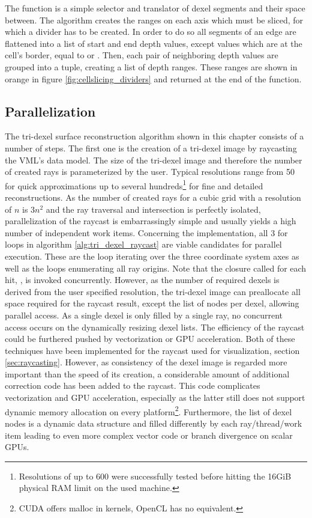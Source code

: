 The  function is a simple selector and translator of dexel segments and their space between.
The algorithm creates the ranges on each axis which must be sliced, \ie for which a divider has to be created.
In order to do so all segments of an edge are flattened into a list of start and end depth values, except values which are at the cell's border, \ie equal to  or .
Then, each pair of neighboring depth values are grouped into a tuple, creating a list of depth ranges.
These ranges are shown in orange in figure \ref{fig:cellslicing_dividers} and returned at the end of the function.


\subsection{Parallelization}
\label{sec:tri_dexel_parallelization}

The tri-dexel surface reconstruction algorithm shown in this chapter consists of a number of steps.
The first one is the creation of a tri-dexel image by raycasting the VML's data model.
The size of the tri-dexel image and therefore the number of created rays is parameterized by the user.
Typical resolutions range from 50 for quick approximations up to several hundreds\footnote{Resolutions of up to 600 were successfully tested before hitting the 16GiB physical RAM limit on the used machine.} for fine and detailed reconstructions.
As the number of created rays for a cubic grid with a resolution of $n$ is $3n^2$ and the ray traversal and intersection is perfectly isolated, parallelization of the raycast is embarrassingly simple and usually yields a high number of independent work items.
Concerning the implementation, all 3 for loops in algorithm \ref{alg:tri_dexel_raycast} are viable candidates for parallel execution.
These are the loop iterating over the three coordinate system axes as well as the loops enumerating all ray origins.
Note that the closure called for each hit, , is invoked concurrently.
However, as the number of required dexels is derived from the user specified resolution, the tri-dexel image can preallocate all space required for the raycast result, except the list of nodes per dexel, allowing parallel access.
As a single dexel is only filled by a single ray, no concurrent access occurs on the dynamically resizing dexel lists.
%
The efficiency of the raycast could be furthered pushed by vectorization or GPU acceleration.
Both of these techniques have been implemented for the raycast used for visualization, \cf section \ref{sec:raycasting}.
However, as consistency of the dexel image is regarded more important than the speed of its creation, a considerable amount of additional correction code has been added to the raycast.
This code complicates vectorization and GPU acceleration, especially as the latter still does not support dynamic memory allocation on every platform\footnote{CUDA offers malloc in kernels, OpenCL has no equivalent.}.
Furthermore, the list of dexel nodes is a dynamic data structure and filled differently by each ray/thread/work item leading to even more complex vector code or branch divergence on scalar GPUs.

